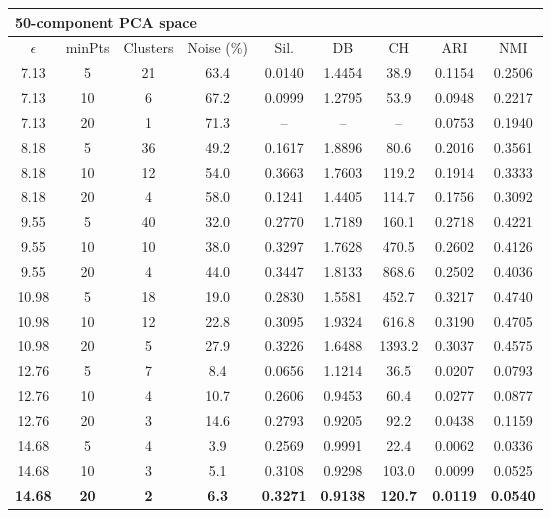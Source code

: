 \documentclass[12pt,a4paper]{article}
\begin{document}
\begin{longtable}{ccccccccc}
\multicolumn{9}{l}{\textbf{50-component PCA space}} \\
\toprule
$\epsilon$ & minPts & Clusters & Noise (\%) & Sil. & DB & CH & ARI & NMI \\
\midrule
7.13 & 5 & 21 & 63.4 & 0.0140 & 1.4454 & 38.9 & 0.1154 & 0.2506 \\
7.13 & 10 & 6 & 67.2 & 0.0999 & 1.2795 & 53.9 & 0.0948 & 0.2217 \\
7.13 & 20 & 1 & 71.3 & -- & -- & -- & 0.0753 & 0.1940 \\
8.18 & 5 & 36 & 49.2 & 0.1617 & 1.8896 & 80.6 & 0.2016 & 0.3561 \\
8.18 & 10 & 12 & 54.0 & 0.3663 & 1.7603 & 119.2 & 0.1914 & 0.3333 \\
8.18 & 20 & 4 & 58.0 & 0.1241 & 1.4405 & 114.7 & 0.1756 & 0.3092 \\
9.55 & 5 & 40 & 32.0 & 0.2770 & 1.7189 & 160.1 & 0.2718 & 0.4221 \\
9.55 & 10 & 10 & 38.0 & 0.3297 & 1.7628 & 470.5 & 0.2602 & 0.4126 \\
9.55 & 20 & 4 & 44.0 & 0.3447 & 1.8133 & 868.6 & 0.2502 & 0.4036 \\
10.98 & 5 & 18 & 19.0 & 0.2830 & 1.5581 & 452.7 & 0.3217 & 0.4740 \\
10.98 & 10 & 12 & 22.8 & 0.3095 & 1.9324 & 616.8 & 0.3190 & 0.4705 \\
10.98 & 20 & 5 & 27.9 & 0.3226 & 1.6488 & 1393.2 & 0.3037 & 0.4575 \\
12.76 & 5 & 7 & 8.4 & 0.0656 & 1.1214 & 36.5 & 0.0207 & 0.0793 \\
12.76 & 10 & 4 & 10.7 & 0.2606 & 0.9453 & 60.4 & 0.0277 & 0.0877 \\
12.76 & 20 & 3 & 14.6 & 0.2793 & 0.9205 & 92.2 & 0.0438 & 0.1159 \\
14.68 & 5 & 4 & 3.9 & 0.2569 & 0.9991 & 22.4 & 0.0062 & 0.0336 \\
14.68 & 10 & 3 & 5.1 & 0.3108 & 0.9298 & 103.0 & 0.0099 & 0.0525 \\
\textbf{14.68} & \textbf{20} & \textbf{2} & \textbf{6.3} & \textbf{0.3271} & \textbf{0.9138} & \textbf{120.7} & \textbf{0.0119} & \textbf{0.0540} \\
\bottomrule
\end{longtable}
\end{document}
